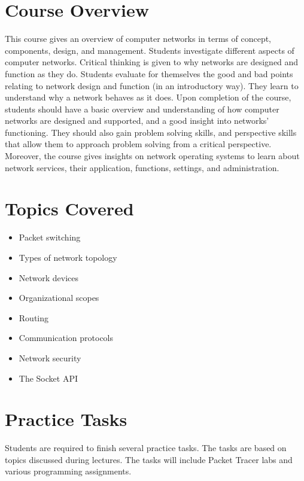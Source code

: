 \documentclass[12pt,a4paper,oneside]{article}
\begin{document}
    \section{Course Overview}

This course gives an overview of computer networks in terms of concept, components, design, and management. Students investigate different aspects of computer networks. Critical thinking is given to why networks are designed and function as they do. Students evaluate for themselves the good and bad points relating to network design and function (in an introductory way). They learn to understand why a network behaves as it does. Upon completion of the course, students should have a basic overview and understanding of how computer networks are designed and supported, and a good insight into networks’ functioning. They should also gain problem solving skills, and perspective skills that allow them to approach problem solving from a critical perspective. Moreover, the course gives insights on network operating systems to learn about network services, their application, functions, settings, and administration.

    \section{Topics Covered}

        \begin{itemize}
            \item Packet switching
            \item Types of network topology
            \item Network devices
            \item Organizational scopes
            \item Routing
            \item Communication protocols
            \item Network security
            \item The Socket API
        \end{itemize}

    \section{Practice Tasks}

        Students are required to finish several practice tasks. The tasks are based
        on topics discussed during lectures. The tasks will include Packet Tracer labs
        and various programming assignments.
\end{document}
